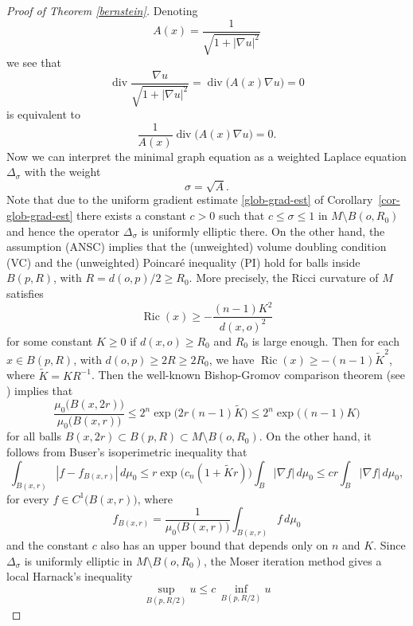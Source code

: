 \documentclass[10pt,a4paper,reqno]{amsart}
\DeclareMathOperator\dv{div}
\DeclareMathOperator\Ric{Ric}
\numberwithin{equation}{section}
\theoremstyle{plain}
\theoremstyle{definition}
\begin{document}
  \begin{proof}[Proof of Theorem \ref{bernstein}]
    Denoting 
    \[
      A(x) = \frac{1}{\sqrt{1+|\nabla u|^2}}
    \]
  we see that 
    \[
      \dv \frac{\nabla u}{\sqrt{1+|\nabla u|^2}} = \dv \big( A(x)\nabla u \big) =0
    \]
  is equivalent to 
    \[
      \frac{1}{A(x)} \dv \big( A(x)\nabla u \big) =0.
    \]
  Now we can interpret the minimal graph equation as a weighted Laplace equation $\Delta_\sigma$ with the weight 
      \[
	\sigma = \sqrt{A}.
      \]
  Note that due to the uniform gradient estimate \eqref{glob-grad-est} of Corollary~\ref{cor-glob-grad-est} there exists a 
  constant $c>0$ such that $c\le  \sigma \le 1$ in $M\setminus B(o,R_0)$ and hence the operator $\Delta_\sigma$ is 
  uniformly elliptic there. 
On the other hand, the assumption (ANSC) implies that the (unweighted) volume doubling condition (VC) and the (unweighted) Poincar\'e inequality
(PI) hold  for balls inside $B(p,R)$, with $R=d(o,p)/2\ge R_0$.
More precisely, the Ricci curvature of $M$ satisfies 
\begin{equation}\label{ric-decay}
\Ric(x)\ge -\frac{(n-1)K^2}{d(x,o)^2}
\end{equation}
for some constant $K\ge 0$ if $d(x,o)\ge R_0$ and $R_0$ is large enough. Then for each $x\in B(p,R)$, with $d(o,p)\ge 2R\ge 2R_0$, we have
$\Ric(x)\ge -(n-1)\tilde{K}^2$, where $\tilde{K}=KR^{-1}$. Then the well-known Bishop-Gromov comparison theorem (see \cite[5.3.bis Lemma]{Gro})
implies that
\begin{equation}\label{BGdoubl}
\frac{\mu_0\bigl(B(x,2r)\bigr)}{\mu_0\bigl(B(x,r)\bigr)}\le 2^n\exp\bigl(2r(n-1)\tilde{K}\bigr)\le 2^n\exp\bigl((n-1)K\bigr)
\end{equation} 
for all balls $B(x,2r)\subset B(p,R)\subset M\setminus B(o,R_0)$. On the other hand, it follows from Buser’s isoperimetric inequality 
\cite{buser} that
\begin{equation}\label{B-PI}
\int_{B(x,r)}|f-f_{B(x,r)}|\,d\mu_0\le r\exp\bigl(c_n(1+\tilde{K}r)\bigr)\int_B |\nabla f|\,d\mu_0\le 
cr\int_B|\nabla f|\,d\mu_0,
\end{equation}
for every $f\in C^1\bigl(B(x,r)\bigr)$, 
where 
\[
f_{B(x,r)}=\frac{1}{\mu_0\bigl(B(x,r)\bigr)}\int_{B(x,r)}f\,d\mu_0
\]
and the constant $c$ also has an upper bound that depends only on $n$ and $K$.
 Since $\Delta_\sigma$ is uniformly elliptic in $M\setminus B(o,R_0)$, the Moser iteration method gives a local Harnack's inequality
\begin{equation}\label{lochar}
\sup_{B(p,R/2)}u\le c\,\inf_{B(p,R/2)}u

\end{equation}
\end{proof}
\end{document}
